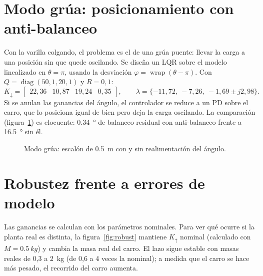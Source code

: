 \section{Modo grúa: posicionamiento con anti-balanceo}
\label{sec:grua}

Con la varilla colgando, el problema es el de una grúa puente: llevar la carga a una posición sin que quede oscilando. Se diseña un LQR sobre el modelo linealizado en $\theta=\pi$, usando la desviación $\varphi=\operatorname{wrap}(\theta-\pi)$. Con $Q=\operatorname{diag}(50,1,20,1)$ y $R=0{,}1$:
\[
K_\downarrow=\begin{bmatrix}22{,}36 & 10{,}87 & 19{,}24 & 0{,}35\end{bmatrix},\qquad
\lambda=\{-11{,}72,\ -7{,}26,\ -1{,}69\pm j2{,}98\}.
\]
Si se anulan las ganancias del ángulo, el controlador se reduce a un PD sobre el carro, que lo posiciona igual de bien pero deja la carga oscilando. La comparación (figura~\ref{fig:grua}) es elocuente: \SI{0.34}{\degree} de balanceo residual con anti-balanceo frente a \SI{16.5}{\degree} sin él.

\begin{figure}[H]
\centering
{}
\caption{Modo grúa: escalón de \SI{0.5}{m} con y sin realimentación del ángulo.}
\label{fig:grua}
\end{figure}

\section{Robustez frente a errores de modelo}

Las ganancias se calculan con los parámetros nominales. Para ver qué ocurre si la planta real es distinta, la figura~\ref{fig:robust} mantiene $K_\uparrow$ nominal (calculado con $M=\SI{0.5}{kg}$) y cambia la masa real del carro. El lazo sigue estable con masas reales de 0,3 a \SI{2}{kg} (de 0,6 a 4 veces la nominal); a medida que el carro se hace más pesado, el recorrido del carro aumenta.

